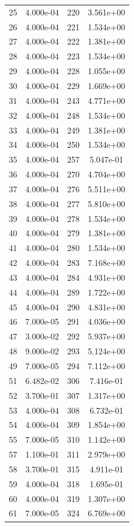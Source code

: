 \documentclass[12pt]{article}
\begin{document}
\begin{longtable}{@{}cccc@{}}
25 & 4.000e-04 & 220 & 3.561e+00 \\
26 & 4.000e-04 & 221 & 1.534e+00 \\
27 & 4.000e-04 & 222 & 1.381e+00 \\
28 & 4.000e-04 & 223 & 1.534e+00 \\
29 & 4.000e-04 & 228 & 1.055e+00 \\
30 & 4.000e-04 & 229 & 1.669e+00 \\
31 & 4.000e-04 & 243 & 4.771e+00 \\
32 & 4.000e-04 & 248 & 1.534e+00 \\
33 & 4.000e-04 & 249 & 1.381e+00 \\
34 & 4.000e-04 & 250 & 1.534e+00 \\
35 & 4.000e-04 & 257 & 5.047e-01 \\
36 & 4.000e-04 & 270 & 4.704e+00 \\
37 & 4.000e-04 & 276 & 5.511e+00 \\
38 & 4.000e-04 & 277 & 5.810e+00 \\
39 & 4.000e-04 & 278 & 1.534e+00 \\
40 & 4.000e-04 & 279 & 1.381e+00 \\
41 & 4.000e-04 & 280 & 1.534e+00 \\
42 & 4.000e-04 & 283 & 7.168e+00 \\
43 & 4.000e-04 & 284 & 4.931e+00 \\
44 & 4.000e-04 & 289 & 1.722e+00 \\
45 & 4.000e-04 & 290 & 4.831e+00 \\
46 & 7.000e-05 & 291 & 4.036e+00 \\
47 & 3.000e-02 & 292 & 5.937e+00 \\
48 & 9.000e-02 & 293 & 5.124e+00 \\
49 & 7.000e-05 & 294 & 7.112e+00 \\
51 & 6.482e-02 & 306 & 7.416e-01 \\
52 & 3.700e-01 & 307 & 1.317e+00 \\
53 & 4.000e-04 & 308 & 6.732e-01 \\
54 & 4.000e-04 & 309 & 1.854e+00 \\
55 & 7.000e-05 & 310 & 1.142e+00 \\
57 & 1.100e-01 & 311 & 2.979e+00 \\
58 & 3.700e-01 & 315 & 4.911e-01 \\
59 & 4.000e-04 & 318 & 1.695e-01 \\
60 & 4.000e-04 & 319 & 1.307e+00 \\
61 & 7.000e-05 & 324 & 6.769e+00 \\

\end{longtable}
\end{document}
